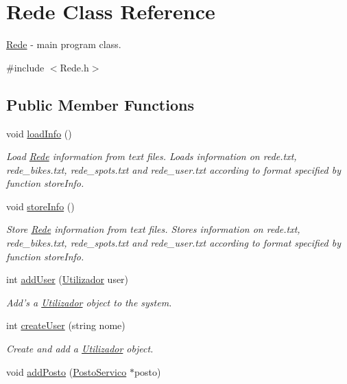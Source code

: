 \hypertarget{class_rede}{\section{Rede Class Reference}
\label{class_rede}
}


\hyperlink{class_rede}{Rede} -\/ main program class.  




{\ttfamily \#include $<$Rede.\+h$>$}

\subsection*{Public Member Functions}
\begin{DoxyCompactItemize}
\item 
\hypertarget{class_rede_a1751f922073f6172ba676a56959a1540}{void \hyperlink{class_rede_a1751f922073f6172ba676a56959a1540}{load\+Info} ()}\label{class_rede_a1751f922073f6172ba676a56959a1540}

\begin{DoxyCompactList}\small\item\em Load \hyperlink{class_rede}{Rede} information from text files. Loads information on rede.\+txt, rede\+\_\+bikes.\+txt, rede\+\_\+spots.\+txt and rede\+\_\+user.\+txt according to format specified by function store\+Info. \end{DoxyCompactList}\item 
\hypertarget{class_rede_abec1da6660663cd58e6851737219959e}{void \hyperlink{class_rede_abec1da6660663cd58e6851737219959e}{store\+Info} ()}\label{class_rede_abec1da6660663cd58e6851737219959e}

\begin{DoxyCompactList}\small\item\em Store \hyperlink{class_rede}{Rede} information from text files. Stores information on rede.\+txt, rede\+\_\+bikes.\+txt, rede\+\_\+spots.\+txt and rede\+\_\+user.\+txt according to format specified by function store\+Info. \end{DoxyCompactList}\item 
int \hyperlink{class_rede_ae78851a9d7efe2a9e0d2ead64f68ef73}{add\+User} (\hyperlink{class_utilizador}{Utilizador} user)
\begin{DoxyCompactList}\small\item\em Add's a \hyperlink{class_utilizador}{Utilizador} object to the system. \end{DoxyCompactList}\item 
int \hyperlink{class_rede_a39d746dc37d11b8c870701a3afa9328e}{create\+User} (string nome)
\begin{DoxyCompactList}\small\item\em Create and add a \hyperlink{class_utilizador}{Utilizador} object. \end{DoxyCompactList}\item 
\hypertarget{class_rede_a00b09749f19ec7535127e75531281511}{void \hyperlink{class_rede_a00b09749f19ec7535127e75531281511}{add\+Posto} (\hyperlink{class_posto_servico}{Posto\+Servico} $\ast$posto)}\label{class_rede_a00b09749f19ec7535127e75531281511}


\end{DoxyCompactItemize}
